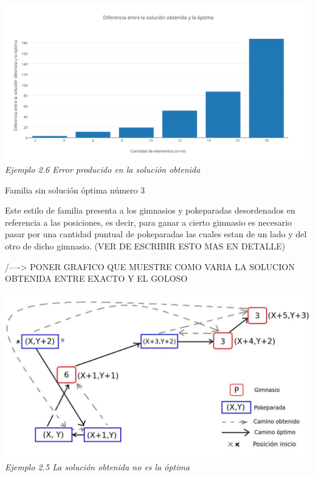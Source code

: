 \vspace*{0.3cm} \vspace*{0.3cm}
  \begin{center}
\includegraphics[scale=0.60]{./EJ2/sinOrden.png}
\\{\textit{Ejemplo 2.6 Error producido en la soluci\'on obtenida}}
  \end{center}
  \vspace*{0.3cm}

\begin{center}
Familia sin soluci\'on \'optima n\'umero 3
\end{center}

Este estilo de familia presenta a los gimnasios y pokeparadas desordenados en referencia a las posiciones, es decir, para ganar a cierto gimnasio es necesario pasar por una cantidad puntual de pokeparadas las cuales estan de un lado y del otro de dicho gimnasio.
(VER DE ESCRIBIR ESTO MAS EN DETALLE)

/----> PONER GRAFICO QUE MUESTRE COMO VARIA LA SOLUCION OBTENIDA ENTRE EXACTO Y EL GOLOSO 



\vspace*{0.3cm} \vspace*{0.3cm}
  \begin{center}
\includegraphics[scale=0.60]{./EJ2/nooptima2.jpeg}
\\{\textit{Ejemplo 2.5 La soluci\'on obtenida no es la \'optima}}
  \end{center}
  \vspace*{0.3cm}
  
